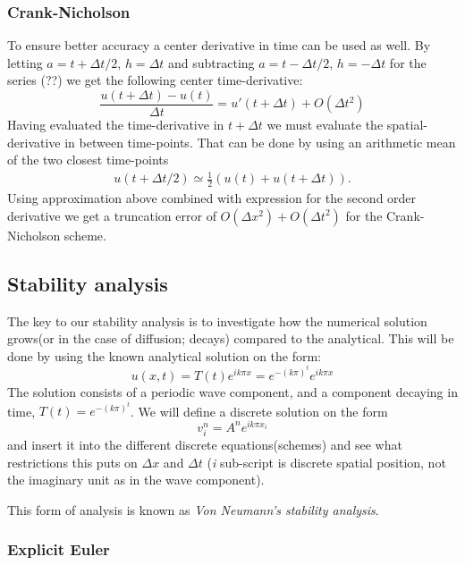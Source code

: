 \documentclass[11pt,a4paper,draft]{article}
\numberwithin{equation}{section}
\begin{document}
\subsubsection{Crank-Nicholson}
To ensure better accuracy a center derivative in time can be used as well. By letting $a=t+\Delta t/2$, $h=\Delta t$ and subtracting $a=t-\Delta t/2$, $h=-\Delta t$ for the series (??) we get the following center time-derivative:
\begin{equation}
\frac{u(t + \Delta t)-u(t)}{\Delta t} = u'(t+\Delta t) + O(\Delta t^2)
\end{equation}
Having evaluated the time-derivative in $t+\Delta t$ we must evaluate the spatial-derivative in between time-points. That can be done by using an arithmetic mean of the two closest time-points
\begin{align*}
u(t+\Delta t/2) \simeq \frac{1}{2}(u(t)+u(t+\Delta t)).
\end{align*}
Using approximation above combined with expression for the second order derivative we get a truncation error of $O(\Delta x^2)+O(\Delta t^2)$ for the Crank-Nicholson scheme. 


\subsection{Stability analysis}

The key to our stability analysis is to investigate how the numerical solution grows(or in the case of diffusion; decays) compared to the analytical. This will be done by using the known analytical solution on the form:
\begin{equation}
u(x,t) = T(t)e^{ik \pi x} = e^{-(k\pi)^t}e^{ik \pi x}
\end{equation}
The solution consists of a periodic wave component, and a component decaying in time, $T(t)=e^{-(k\pi)^t}$. We will define a discrete solution on the form
\begin{equation}
v^n_i = A^n e^{ik \pi x_i}
\end{equation}
and insert it into the different discrete equations(schemes) and see what restrictions this puts on $\Delta x$ and $\Delta t$ (\emph{i} sub-script is discrete spatial position, not the imaginary unit as in the wave component).

This form of analysis is known as \emph{Von Neumann's stability analysis}.

\subsubsection{Explicit Euler}
\end{document}
